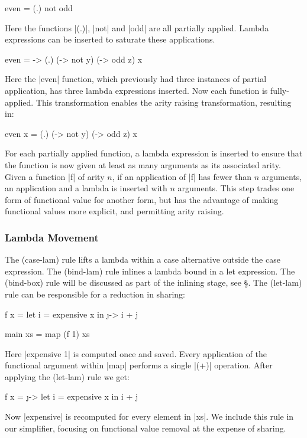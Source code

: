 \documentclass[preprint]{sigplanconf}
\begin{document}
\begin{example}
\begin{code}
even = (.) not odd
\end{code}

Here the functions |(.)|, |not| and |odd| are all partially applied. Lambda expressions can be inserted to saturate these applications.

\begin{code}
even = \x -> (.) (\y -> not y) (\z -> odd z) x
\end{code}

Here the |even| function, which previously had three instances of partial application, has three lambda expressions inserted. Now each function is fully-applied. This transformation enables the arity raising transformation, resulting in:

\begin{code}
even x = (.) (\y -> not y) (\z -> odd z) x
\end{code}
\end{example}

For each partially applied function, a lambda expression is inserted to ensure that the function is now given at least as many arguments as its associated arity. Given a function |f| of arity $n$, if an application of |f| has fewer than $n$ arguments, an application and a lambda is inserted with $n$ arguments. This step trades one form of functional value for another form, but has the advantage of making functional values more explicit, and permitting arity raising.

\subsubsection{Lambda Movement}
\label{sec:sharing}

The (case-lam) rule lifts a lambda within a case alternative outside the case expression. The (bind-lam) rule inlines a lambda bound in a let expression. The (bind-box) rule will be discussed as part of the inlining stage, see \S\label{sec:inlining}. The (let-lam) rule can be responsible for a reduction in sharing:

\begin{example}
\begin{code}
f x =  let i = expensive x
       in \j -> i + j

main xs = map (f 1) xs
\end{code}

Here |expensive 1| is computed once and saved. Every application of the functional argument within |map| performs a single |(+)| operation. After applying the (let-lam) rule we get:

\begin{code}
f x =  \j ->  let i = expensive x
              in i + j
\end{code}

Now |expensive| is recomputed for every element in |xs|. We include this rule in our simplifier, focusing on functional value removal at the expense of sharing.
\end{example}
\end{document}
